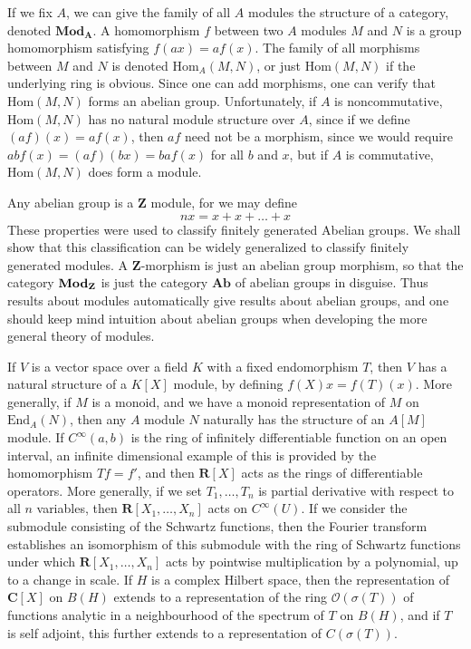 If we fix $A$, we can give the family of all $A$ modules the structure of a category, denoted $\textbf{Mod}_{\textbf{A}}$. A homomorphism $f$ between two $A$ modules $M$ and $N$ is a group homomorphism satisfying $f(ax) = af(x)$. The family of all morphisms between $M$ and $N$ is denoted $\text{Hom}_A(M,N)$, or just $\text{Hom}(M,N)$ if the underlying ring is obvious. Since one can add morphisms, one can verify that $\text{Hom}(M,N)$ forms an abelian group. Unfortunately, if $A$ is noncommutative, $\text{Hom}(M,N)$ has no natural module structure over $A$, since if we define $(af)(x) = af(x)$, then $af$ need not be a morphism, since we would require $ab f(x) = (af)(bx) = ba f(x)$ for all $b$ and $x$, but if $A$ is commutative, $\text{Hom}(M,N)$ does form a module.

\begin{example}
    Any abelian group is a $\mathbf{Z}$ module, for we may define
    \[ nx = x + x + \dots + x \]
    These properties were used to classify finitely generated Abelian groups. We shall show that this classification can be widely generalized to classify finitely generated modules. A $\mathbf{Z}$-morphism is just an abelian group morphism, so that the category $\text{{\bf Mod}}_\mathbf{Z}$ is just the category $\mathbf{Ab}$ of abelian groups in disguise. Thus results about modules automatically give results about abelian groups, and one should keep mind intuition about abelian groups when developing the more general theory of modules.
\end{example}

\begin{example}
    If $V$ is a vector space over a field $K$ with a fixed endomorphism $T$, then $V$ has a natural structure of a $K[X]$ module, by defining $f(X) x = f(T)(x)$. More generally, if $M$ is a monoid, and we have a monoid representation of $M$ on $\text{End}_A(N)$, then any $A$ module $N$ naturally has the structure of an $A[M]$ module. If $C^\infty(a,b)$ is the ring of infinitely differentiable function on an open interval, an infinite dimensional example of this is provided by the homomorphism $Tf = f'$, and then $\mathbf{R}[X]$ acts as the rings of differentiable operators. More generally, if we set $T_1, \dots, T_n$ is partial derivative with respect to all $n$ variables, then $\mathbf{R}[X_1, \dots, X_n]$ acts on $C^\infty(U)$. If we consider the submodule consisting of the Schwartz functions, then the Fourier transform establishes an isomorphism of this submodule with the ring of Schwartz functions under which $\mathbf{R}[X_1, \dots, X_n]$ acts by pointwise multiplication by a polynomial, up to a change in scale. If $H$ is a complex Hilbert space, then the representation of $\mathbf{C}[X]$ on $B(H)$ extends to a representation of the ring $\mathcal{O}(\sigma(T))$ of functions analytic in a neighbourhood of the spectrum of $T$ on $B(H)$, and if $T$ is self adjoint, this further extends to a representation of $C(\sigma(T))$.
\end{example}

